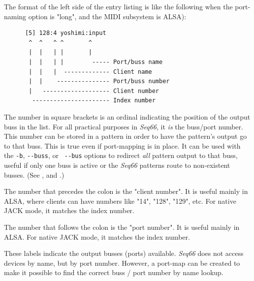    The format of the left side of the entry listing is like the following
   when the port-naming option is "long", and the
   MIDI subsystem is ALSA):

   \begin{verbatim}
      [5] 128:4 yoshimi:input
       ^  ^   ^ ^       ^
       |  |   | |       |
       |  |   | |        ----- Port/buss name
       |  |   |  ------------- Client name
       |  |    --------------- Port/buss number
       |   ------------------- Client number
        ---------------------- Index number
   \end{verbatim}

   \setcounter{ItemCounter}{0}      %

   The number in square brackets is an ordinal indicating the position
   of the output buss in the list.
   For all practical purposes in \textsl{Seq66}, it \textsl{is} the
   buss/port number.  This number can be stored in a pattern in order to have
   the pattern's output go to that buss.  
   This is true even if port-mapping is in place.
   It can be used with the \texttt{-b},
   \texttt{-{}-buss}, or \texttt{ -{}-bus} options to redirect
   \textsl{all}
   pattern output to that buss, useful if only one buss is active or the
   \textsl{Seq66} patterns route to non-existent busses.
   (See ,
   and .)

   The number that precedes the colon is the "client number".
   It is useful mainly in ALSA, where clients can have numbers like "14",
   "128", "129", etc.  For native JACK mode, it matches the index number.

   The number that follows the colon is the "port number".
   It is useful mainly in ALSA.
   For native JACK mode, it matches the index number.

   These labels indicate the output busses (ports) available.
   \textsl{Seq66} does not access devices by name, but by port number.
   However, a port-map can be created to make it possible to find the correct
   buss / port number by name lookup.

